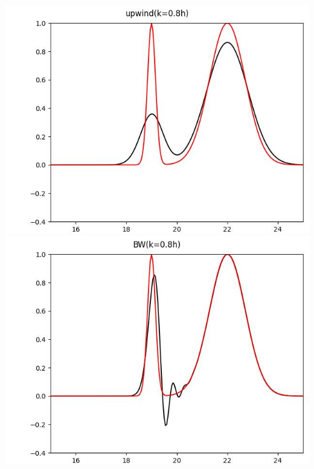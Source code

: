\documentclass[12pt]{ctexart}
\begin{document}
\includegraphics[scale=0.52]{upwind(k=0.8h).jpg}
\includegraphics[scale=0.52]{BW(k=0.8h).jpg}
\end{document}
